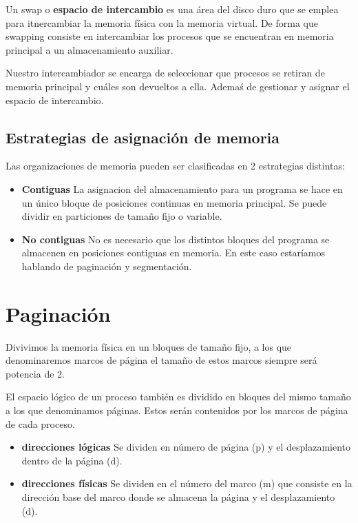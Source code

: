 Un swap o \textbf{espacio de intercambio} es una área del disco duro que se emplea para itnercambiar la memoria física con la memoria virtual. De forma que swapping consiste en intercambiar los procesos que se encuentran en memoria principal a un almacenamiento auxiliar.

Nuestro intercambiador se encarga de seleccionar que procesos se retiran de memoria principal y cuáles son devueltos a ella. Ademaś de gestionar y asignar el espacio de intercambio.

\subsection*{Estrategias de asignación de memoria}

Las organizaciones de memoria pueden ser clasificadas en 2 estrategias distintas:

\begin{itemize}
	\item \textbf{Contiguas} La asignacion del almacenamiento para un programa se hace en un único bloque de posiciones continuas en memoria principal. Se puede dividir en particiones de tamaño fijo o variable.
	\item \textbf{No contiguas} No es necesario que los distintos bloques del programa se almacenen en posiciones contiguas en memoria. En este caso estaríamos hablando de paginación y segmentación.
\end{itemize}

\section*{Paginación}
Divivimos la memoria física en un bloques de tamaño fijo, a los que denominaremos marcos de página el tamaño de estos marcos siempre será potencia de 2.

El espacio lógico de un proceso también es dividido en bloques del mismo tamaño a los que denominamos páginas. Estos serán contenidos por los marcos de página de cada proceso.

\begin{itemize}
	\item \textbf{direcciones lógicas} Se dividen en número de página (p) y el desplazamiento dentro de la página (d).
	\item \textbf{direcciones físicas} Se dividen en el número del marco (m) que consiste en la dirección base del marco donde se almacena la página y el desplazamiento (d).
\end{itemize}

